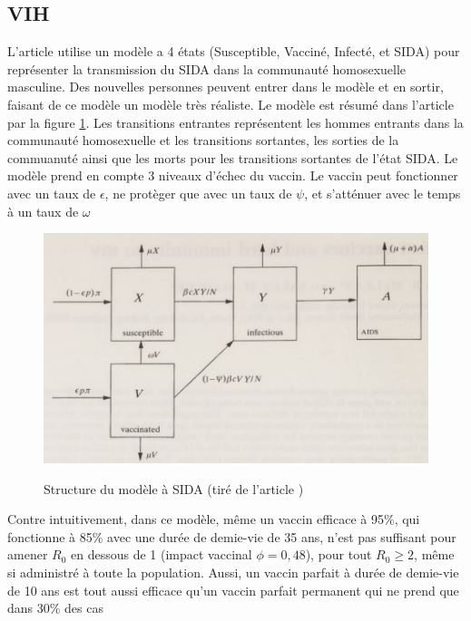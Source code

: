 \documentclass[journal, a4paper]{IEEEtran}
\begin{document}
	\subsection{VIH}
	L'article \cite{Imperfect_vaccines_and_herd_immunity_to_HIV_1993} utilise un modèle a 4 états (Susceptible, Vacciné, Infecté, et SIDA) pour représenter la transmission du SIDA dans la communauté homosexuelle masculine.
	Des nouvelles personnes peuvent entrer dans le modèle et en sortir, faisant de ce modèle un modèle très réaliste. Le modèle est résumé dans l'article par la figure \ref{fig:hiv_model}. Les transitions entrantes représentent les hommes entrants dans la communauté homosexuelle et les transitions sortantes, les sorties de la commuanuté ainsi que les morts pour les transitions sortantes de l'état SIDA. Le modèle prend en compte 3 niveaux d'échec du vaccin. Le vaccin peut fonctionner avec un taux de $\epsilon$, ne protèger que avec un taux de $\psi$, et s'atténuer avec le temps à un taux de $\omega$

	\begin{figure}[!hbt]
	 \caption{Structure du modèle à SIDA (tiré de l'article \cite{Imperfect_vaccines_and_herd_immunity_to_HIV_1993})}
	 \includegraphics[width=\columnwidth]{Imperfect vaccines and herd immunity to hiv_model}
	 \label{fig:hiv_model}

	\end{figure}

	Contre intuitivement, dans ce modèle, même un vaccin efficace à 95\%, qui fonctionne à 85\% avec une durée de demie-vie de 35 ans, n'est pas suffisant pour amener $R_0$ en dessous de 1 (impact vaccinal $\phi = 0,48$), pour tout $R_0 \geq 2$, même si administré à toute la population. Aussi, un vaccin parfait à durée de demie-vie de 10 ans est tout aussi efficace qu'un vaccin parfait permanent qui ne prend que dans 30\% des cas
\end{document}
